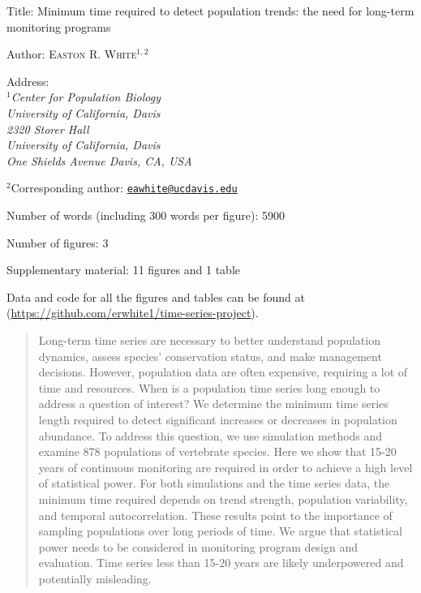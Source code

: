 \documentclass[12pt,]{article}
\title{}
\author{}
\date{}
\begin{document}
Title: Minimum time required to detect population trends: the need for
long-term monitoring programs \vspace{7 mm}

Author: \textsc{Easton R. White$^{1,2}$} \vspace{3 mm}

Address:\emph{
    \\$^1$Center for Population Biology \\
    University of California, Davis \\
    2320 Storer Hall \\
        University of California, Davis \\
        One Shields Avenue Davis, CA, USA} \vspace{3 mm}

\(^2\)Corresponding author:
\href{mailto:eawhite@ucdavis.edu}{\nolinkurl{eawhite@ucdavis.edu}}
\vspace{3 mm}

Number of words (including 300 words per figure): 5900 \vspace{1 mm}

Number of figures: 3 \vspace{1 mm}

Supplementary material: 11 figures and 1 table \vspace{3 mm}

Data and code for all the figures and tables can be found at
(\url{https://github.com/erwhite1/time-series-project}).

\vspace{3 mm}

\pagebreak 

\linenumbers

\begin{abstract}
Long-term time series are necessary to better understand population dynamics, assess species' conservation status, and make management decisions. However, population data are often expensive, requiring a lot of time and resources. When is a population time series long enough to address a question of interest? We determine the minimum time series length required to detect significant increases or decreases in population abundance. To address this question, we use simulation methods and examine 878 populations of vertebrate species. Here we show that 15-20 years of continuous monitoring are required in order to achieve a high level of statistical power. For both simulations and the time series data, the minimum time required depends on trend strength, population variability, and temporal autocorrelation. These results point to the importance of sampling populations over long periods of time. We argue that statistical power needs to be considered in monitoring program design and evaluation. Time series less than 15-20 years are likely underpowered and potentially misleading.
\end{abstract}
\end{document}
